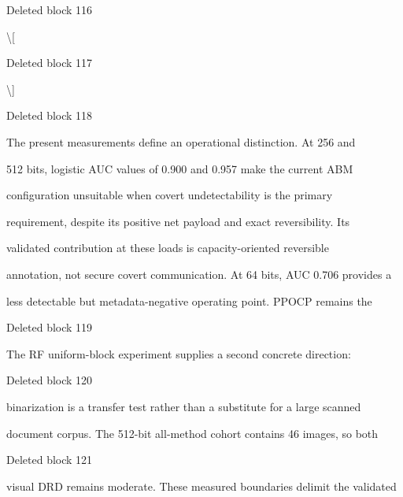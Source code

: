 \documentclass[a4paper,fleqn]{cas-dc}
\newenvironment{RevisionDeletion}{%
  \par\begingroup\color{revisionred}\footnotesize\ttfamily
  \setlength{\parindent}{0pt}\setlength{\parskip}{1pt}\obeyspaces
}{\par\endgroup}
\begin{document}
\begin{RevisionDeletion}
Deleted block 116\par
\textbackslash{}[\par
\end{RevisionDeletion}

\begin{RevisionDeletion}
Deleted block 117\par
\textbackslash{}]\par
\end{RevisionDeletion}

\begin{RevisionDeletion}
Deleted block 118\par
The present measurements define an operational distinction. At 256 and\par
512 bits, logistic AUC values of 0.900 and 0.957 make the current ABM\par
configuration unsuitable when covert undetectability is the primary\par
requirement, despite its positive net payload and exact reversibility. Its\par
validated contribution at these loads is capacity-oriented reversible\par
annotation, not secure covert communication. At 64 bits, AUC 0.706 provides a\par
less detectable but metadata-negative operating point. PPOCP remains the\par
\end{RevisionDeletion}

\begin{RevisionDeletion}
Deleted block 119\par
The RF uniform-block experiment supplies a second concrete direction:\par
\end{RevisionDeletion}

\begin{RevisionDeletion}
Deleted block 120\par
binarization is a transfer test rather than a substitute for a large scanned\par
document corpus. The 512-bit all-method cohort contains 46 images, so both\par
\end{RevisionDeletion}

\begin{RevisionDeletion}
Deleted block 121\par
visual DRD remains moderate. These measured boundaries delimit the validated\par
\end{RevisionDeletion}
\end{document}
